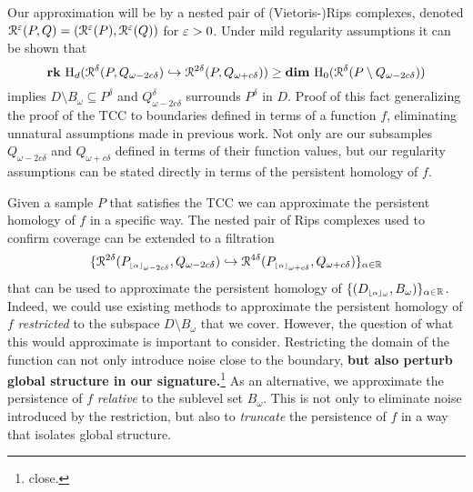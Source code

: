 Our approximation will be by a nested pair of (Vietoris-)Rips complexes, denoted $\mathcal{R}^\varepsilon(P, Q) = (\mathcal{R}^\varepsilon(P), \mathcal{R}^\varepsilon(Q))$ for $\varepsilon > 0$.
Under mild regularity assumptions it can be shown that
\[ \mathbf{rk}~\mathrm{H}_d(\mathcal{R}^\delta(P, Q_{\omega - 2c\delta})\hookrightarrow \mathcal{R}^{2\delta}(P, Q_{\omega+c\delta}))\geq \mathbf{dim}~\mathrm{H}_0(\mathcal{R}^\delta(P\setminus Q_{\omega-2c\delta}))\]
implies $D\setminus B_\omega\subseteq P^\delta$ and $Q_{\omega-2c\delta}^\delta$ surrounds $P^\delta$ in $D$.
Proof of this fact generalizing the proof of the TCC to boundaries defined in terms of a function $f$, eliminating unnatural assumptions made in previous work.
Not only are our subsamples $Q_{\omega-2c\delta}$ and $Q_{\omega+c\delta}$ defined in terms of their function values, but our regularity assumptions can be stated directly in terms of the persistent homology of $f$.

Given a sample $P$ that satisfies the TCC we can approximate the persistent homology of $f$ in a specific way.
The nested pair of Rips complexes used to confirm coverage can be extended to a filtration
\[ \{\mathcal{R}^{2\delta}(P_{\scriptscriptstyle \lfloor\alpha\rfloor_{\omega-2c\delta}}, Q_{\omega-2c\delta})\hookrightarrow \mathcal{R}^{4\delta}(P_{\scriptscriptstyle \lfloor\alpha\rfloor_{\omega+c\delta}}, Q_{\omega+c\delta})\}_{\alpha\in\mathbb{R}}\]
that can be used to approximate the persistent homology of $\{(D_{\scriptscriptstyle \lfloor\alpha\rfloor_{\omega}}, B_\omega)\}_{\alpha\in\mathbb{R}}$.
Indeed, we could use existing methods to approximate the persistent homology of $f$ \emph{restricted} to the subspace $D\setminus B_\omega$ that we cover.
However, the question of what this would approximate is important to consider.
{\color{red} Restricting the domain of the function can not only introduce noise close to the boundary, \textbf{but also perturb global structure in our signature.}\footnote{\color{red} close.}}
As an alternative, we approximate the persistence of $f$ \emph{relative} to the sublevel set $B_\omega$.
This is not only to eliminate noise introduced by the restriction, but also to \emph{truncate} the persistence of $f$ in a way that isolates global structure.

